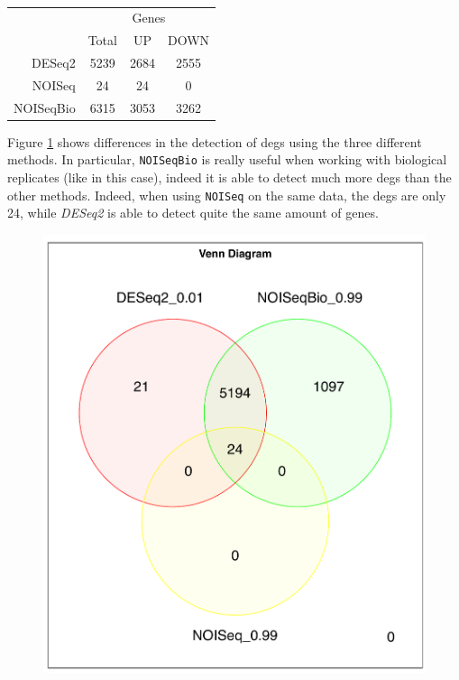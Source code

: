 \begin{table}[H]
\centering
\begin{tabular}{r c c c}
\multicolumn{1}{r}{} & \multicolumn{3}{c}{Genes} \\
\cline{2-4}
\multicolumn{1}{r}{} & Total & UP & DOWN \\
\cline{2-4}
DESeq2 & 5239 & 2684 & 2555 \\
NOISeq & 24 & 24 & 0 \\
NOISeqBio & 6315 & 3053 & 3262 \\
\end{tabular}
\caption[\gls{tic} Single Time Points DE methods results]{}
\label{tab:ticorserderesultstp}
\end{table}

Figure \ref{fig:ticorsertpvenn} shows differences in the detection of \glspl{deg} using the three different methods.
In particular, \lstinline!NOISeqBio! is really useful when working with biological replicates (like in this case), indeed it is able to detect much more \glspl{deg} than the other methods. 
Indeed, when using \lstinline!NOISeq! on the same data, the \glspl{deg} are only 24, while \textit{DESeq2} is able to detect quite the same amount of genes.

\begin{figure}[H]
\includegraphics[width=\textwidth,height=\textheight,keepaspectratio]{img/ticorser/de/singleTP/venn.pdf}
\caption[ticorser venn diagram single time point]{}
\label{fig:ticorsertpvenn}
\centering
\end{figure}

